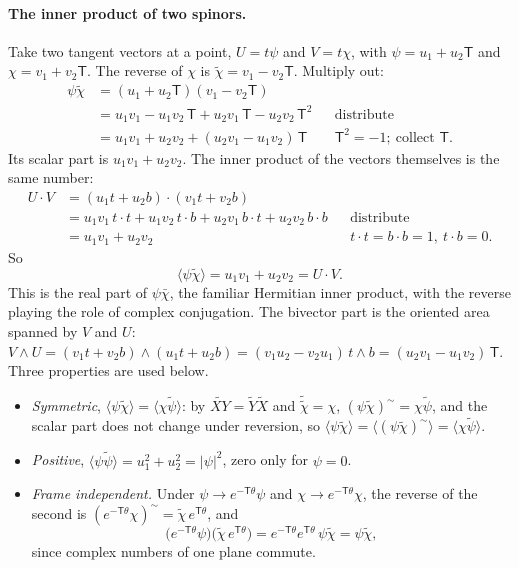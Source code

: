 \paragraph{The inner product of two spinors.} Take two tangent vectors at a point, $U = t\psi$ and $V = t\chi$, with $\psi = u_1 + u_2 \mathsf T$ and $\chi = v_1 + v_2 \mathsf T$. The reverse of $\chi$ is $\widetilde \chi = v_1 - v_2 \mathsf T$. Multiply out:
\begin{align*}
\psi\widetilde\chi &= (u_1 + u_2\mathsf T)(v_1 - v_2\mathsf T) \\
&= u_1 v_1 - u_1 v_2\,\mathsf T + u_2 v_1\,\mathsf T - u_2 v_2\,\mathsf T^2 && \text{distribute} \\
&= u_1 v_1 + u_2 v_2 + (u_2 v_1 - u_1 v_2)\,\mathsf T && \mathsf T^2 = -1;\ \text{collect } \mathsf T .
\end{align*}
Its scalar part is $u_1v_1 + u_2v_2$. The inner product of the vectors themselves is the same number:
\begin{align*}
U\cdot V &= (u_1 t + u_2 b)\cdot(v_1 t + v_2 b) \\
&= u_1v_1\, t\cdot t + u_1v_2\, t\cdot b + u_2v_1\, b\cdot t + u_2v_2\, b\cdot b && \text{distribute} \\
&= u_1v_1 + u_2v_2 && t\cdot t = b\cdot b = 1,\ t\cdot b = 0 .
\end{align*}
So
\begin{equation}
\label{eqn:r2_inner}
\langle \psi \widetilde\chi \rangle = u_1 v_1 + u_2 v_2 = U \cdot V .
\end{equation}
This is the real part of $\psi \bar\chi$, the familiar Hermitian inner product, with the reverse playing the role of complex conjugation. The bivector part is the oriented area spanned by $V$ and $U$: $V\wedge U = (v_1t + v_2b)\wedge(u_1t + u_2b) = (v_1u_2 - v_2u_1)\, t\wedge b = (u_2v_1 - u_1v_2)\,\mathsf T$. Three properties are used below.
\begin{itemize}
\item \emph{Symmetric}, $\langle\psi\widetilde\chi\rangle = \langle\chi\widetilde\psi\rangle$: by $\widetilde{XY} = \widetilde Y\widetilde X$ and $\widetilde{\widetilde\chi} = \chi$, $(\psi\widetilde\chi)^\sim = \chi\widetilde\psi$, and the scalar part does not change under reversion, so $\langle\psi\widetilde\chi\rangle = \langle(\psi\widetilde\chi)^\sim\rangle = \langle\chi\widetilde\psi\rangle$.
\item \emph{Positive}, $\langle\psi\widetilde\psi\rangle = u_1^2 + u_2^2 = |\psi|^2$, zero only for $\psi = 0$.
\item \emph{Frame independent.} Under $\psi \to e^{-\mathsf T\theta}\psi$ and $\chi\to e^{-\mathsf T\theta}\chi$, the reverse of the second is $(e^{-\mathsf T\theta}\chi)^\sim = \widetilde\chi\, e^{\mathsf T\theta}$, and
\begin{equation*}
\big(e^{-\mathsf T\theta}\psi\big)\big(\widetilde\chi\, e^{\mathsf T\theta}\big) = e^{-\mathsf T\theta}e^{\mathsf T\theta}\,\psi\widetilde\chi = \psi\widetilde\chi ,
\end{equation*}
since complex numbers of one plane commute.
\end{itemize}

